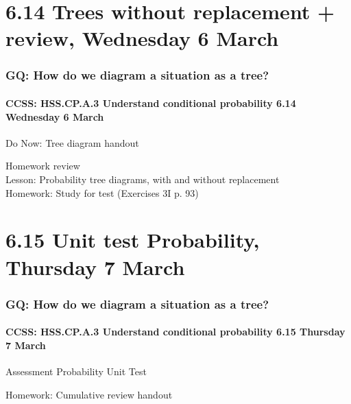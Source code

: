\documentclass{beamer}
\begin{document}
\section{6.14 Trees without replacement + review, Wednesday 6 March}
  \frame
  {
    \frametitle{GQ: How do we diagram a situation as a tree?}
    \framesubtitle{CCSS: HSS.CP.A.3 Understand conditional probability \hfill \alert{6.14 Wednesday 6 March}}

    \begin{block}{Do Now: Tree diagram handout}
    \end{block}
    Homework review\\
    Lesson: Probability tree diagrams, with and without replacement\\[0.5cm]
    Homework: Study for test (Exercises 3I p. 93)
  }


\section{6.15 Unit test Probability, Thursday 7 March}
  \frame
  {
    \frametitle{GQ: How do we diagram a situation as a tree?}
    \framesubtitle{CCSS: HSS.CP.A.3 Understand conditional probability \hfill \alert{6.15 Thursday 7 March}}

    \begin{block}{Assessment Probability Unit Test}
    \end{block}

    Homework: Cumulative review handout
  }
\end{document}
